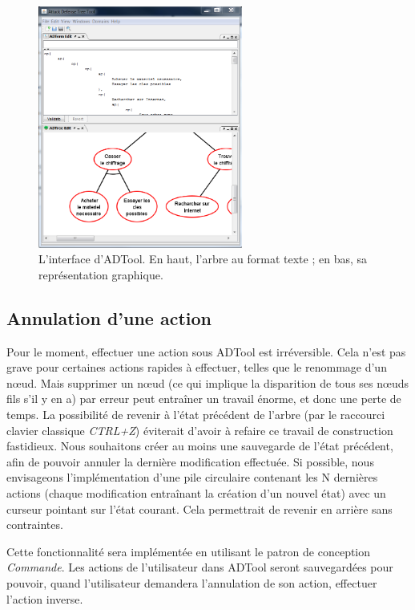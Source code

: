 		\begin{figure}[h]
			\centering
			\includegraphics[width=0.6\textwidth]{figure/interface_adtool.png}
			\caption{L'interface d'ADTool. En haut, l'arbre au format texte ; en bas, sa représentation graphique.}
			\label{fig:int_adTool}
		\end{figure}
	
	\subsection{Annulation d'une action}	
		Pour le moment, effectuer une action sous ADTool est irréversible. Cela n'est pas grave pour certaines actions rapides à effectuer, telles que le renommage d'un nœud. Mais supprimer un nœud (ce qui implique la disparition de tous ses nœuds fils s'il y en a) par erreur peut entraîner un travail énorme, et donc une perte de temps. La possibilité de revenir à l'état précédent de l'arbre (par le raccourci clavier classique \emph{CTRL+Z}) éviterait d'avoir à refaire ce travail de construction fastidieux. Nous souhaitons créer au moins une sauvegarde de l'état précédent, afin de pouvoir annuler la dernière modification effectuée. Si possible, nous envisageons l'implémentation d'une pile circulaire contenant les N dernières actions (chaque modification entraînant la création d'un nouvel état) avec un curseur pointant sur l'état courant. Cela permettrait de revenir en arrière sans contraintes. 

		Cette fonctionnalité sera implémentée en utilisant le patron de conception \emph{Commande}. Les actions de l'utilisateur dans ADTool seront sauvegardées pour pouvoir, quand l'utilisateur demandera l'annulation de son action, effectuer l'action inverse. 


